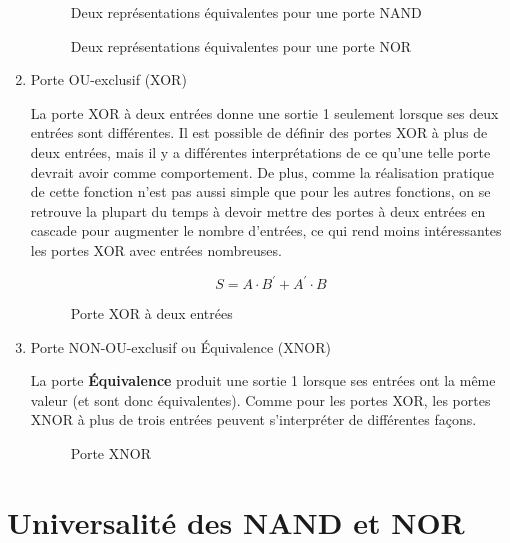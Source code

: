 \documentclass[letter, oneside]{book}
\begin{document}
\begin{enumerate}
\begin{figure}[htbp]
\centering

\caption{\label{fig:org6699a97}Deux représentations équivalentes pour une porte NAND}
\end{figure}

\begin{figure}[htbp]
\centering

\caption{\label{fig:org9c76792}Deux représentations équivalentes pour une porte NOR}
\end{figure}

\item Porte OU-exclusif (XOR)
\label{sec:orgf30621d}

La porte XOR à deux entrées donne une sortie 1 seulement lorsque ses
deux entrées sont différentes. Il est possible de définir des portes
XOR à plus de deux entrées, mais il y a différentes interprétations de
ce qu'une telle porte devrait avoir comme comportement. De plus, comme
la réalisation pratique de cette fonction n'est pas aussi simple que
pour les autres fonctions, on se retrouve la plupart du temps à devoir
mettre des portes à deux entrées en cascade pour augmenter le nombre
d'entrées, ce qui rend moins intéressantes les portes XOR avec entrées
nombreuses.

$$ S= A \cdot B^\prime + A^\prime \cdot B $$  

\begin{figure}[htbp]
\centering

\caption{\label{fig:org226d26b}Porte XOR à deux entrées}
\end{figure}

\item Porte NON-OU-exclusif ou Équivalence (XNOR)
\label{sec:orgf8511a3}

La porte \textbf{Équivalence} produit une sortie 1 lorsque ses entrées ont la
même valeur (et sont donc équivalentes). Comme pour les portes XOR,
les portes XNOR à plus de trois entrées peuvent s'interpréter de
différentes façons.

\begin{figure}[htbp]
\centering

\caption{\label{fig:orgdd5ee08}Porte XNOR}
\end{figure}
\end{enumerate}

\section{Universalité des NAND et NOR}
\label{sec:org8cf0053}
\end{document}
